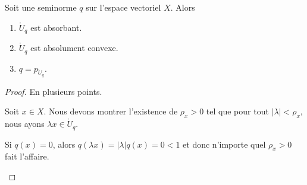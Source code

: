\begin{lemma}		\label{LEMooFWCIooVwGutp}
	Soit une seminorme \( q\) sur l'espace vectoriel \( X\). Alors
	\begin{enumerate}
		\item
		      \( \mathring{U}_q\) est absorbant.
		\item
		      \( \mathring{U}_q\) est absolument convexe.
		\item
		      \( q=p_{\mathring{U}_q}\).
	\end{enumerate}
\end{lemma}

\begin{proof}
	En plusieurs points.
	\begin{subproof}
		Soit \( x\in X\). Nous devons montrer l'existence de \( \rho_x>0\) tel que pour tout \( | \lambda |<\rho_x\), nous ayons \( \lambda x\in \mathring{U}_q\).

		Si \( q(x)=0\), alors \( q(\lambda x)=| \lambda |q(x)=0<1\) et donc n'importe quel \( \rho_x>0\) fait l'affaire.


\end{subproof}
\end{proof}
